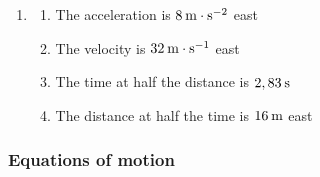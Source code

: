 {\begin{mdframed}[linewidth=4, leftmargin=40, rightmargin=40]
\begin{exercise}
\begin{enumerate}[noitemsep, label=\textbf{Step} \textbf{\arabic*}. ]
          
          
          \item 
\label{m38796*uid081231}\begin{enumerate}[noitemsep, label=\textbf{\alph*}. ] 
            \leftskip=20pt\rightskip=\leftskip\item The acceleration is \begin{math}8\phantom{\rule{2pt}{0ex}}\mathrm{m}\ensuremath{\cdot}\mathrm{s}{}^{-2}\end{math} east\item The velocity is \begin{math}32\phantom{\rule{2pt}{0ex}}\mathrm{m}\ensuremath{\cdot}\mathrm{s}{}^{-1}\end{math} east\item The time at half the distance is \begin{math}2,83\phantom{\rule{2pt}{0ex}}\mathrm{s}\end{math} \item The distance at half the time is \begin{math}16\phantom{\rule{2pt}{0ex}}\mathrm{m}\end{math} east \end{enumerate}
        
\end{enumerate}
         

    \end{exercise}
    \end{mdframed}
    }
    \noindent
  
\label{m38796*secfhsst!!!underscore!!!id5845}
            \subsubsection{ Equations of motion}
            \nopagebreak
            
